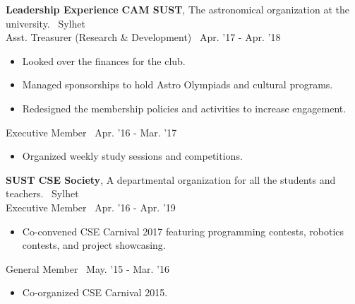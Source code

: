 \begin{rSection}{\textbf{Leadership Experience}}
{\bf CAM SUST}{, The astronomical organization at the university.} \hfill {\ {Sylhet}}\\
Asst. Treasurer (Research \& Development) \hfill {\ Apr. '17 - Apr. '18}
\begin{itemize}
  \item \vspace{-0.5em} Looked over the finances for the club.
  \item \vspace{-0.5em} Managed sponsorships to hold Astro Olympiads and cultural programs.
  \item \vspace{-0.5em} Redesigned the membership policies and activities to increase engagement.
  \vspace{-0.3em}
\end{itemize} 

Executive Member \hfill {\ Apr. '16 - Mar. '17}
\begin{itemize}
  \item \vspace{-0.5em}  Organized weekly study sessions and competitions.
  \vspace{-0.3em}
\end{itemize} 


{\bf SUST CSE Society}{, A departmental organization for all the students and teachers.} \hfill {\ {Sylhet}}\\
Executive Member \hfill {\ Apr. '16 - Apr. '19} 
\begin{itemize}
  \item \vspace{-0.5em} Co-convened CSE Carnival 2017 featuring programming contests, robotics contests, and project showcasing.
  \vspace{-0.3em}
\end{itemize} 

General Member \hfill {\ May. '15 - Mar. '16} 
\begin{itemize}
  \item \vspace{-0.5em} Co-organized CSE Carnival 2015. 
  \vspace{-0.3em}
\end{itemize} 


\end{rSection}
